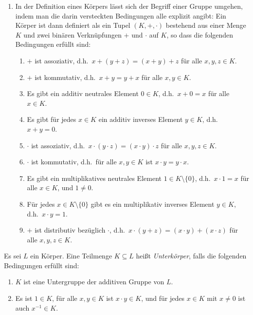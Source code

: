 \begin{bem}
\begin{enumerate}[leftmargin=*]
  \item
   In der Definition eines Körpers lässt sich der Begriff einer Gruppe umgehen, indem man die darin versteckten Bedingungen alle explizit angibt: Ein Körper ist dann definiert als ein Tupel $(K,+,\cdot)$ bestehend aus einer Menge $K$ und zwei binären Verknüpfungen $+$ und $\cdot$ auf $K$, so dass die folgenden Bedingungen erfüllt sind:
   \begin{enumerate}[label=\roman*)]
    \item
     $+$ ist assoziativ, d.h.\ $x+(y+z) = (x+y)+z$ für alle $x,y,z \in K$.
    \item
     $+$ ist kommutativ, d.h.\ $x+y = y+x$ für alle $x,y \in K$.
    \item
     Es gibt ein additiv neutrales Element $0 \in K$, d.h.\ $x + 0 = x$ für alle $x \in K$.
    \item
     Es gibt für jedes $x \in K$ ein additiv inverses Element $y \in K$, d.h.\ $x+y = 0$.
    \item
     $\cdot$ ist assoziativ, d.h.\ $x \cdot (y \cdot z) = (x \cdot y) \cdot z$ für alle $x,y,z \in K$.
    \item
     $\cdot$ ist kommutativ, d.h.\ für alle $x,y \in K$ ist $x \cdot y = y \cdot x$.
    \item
     Es gibt ein multiplikatives neutrales Element $1 \in K\setminus\{0\}$, d.h.\ $x \cdot 1 = x$ für alle $x \in K$, und $1 \neq 0$.
    \item
     Für jedes $x \in K\setminus\{0\}$ gibt es ein multiplikativ inverses Element $y \in K$, d.h.\ $x \cdot y = 1$.
    \item
     $+$ ist distributiv bezüglich $\cdot$, d.h.\ $x \cdot (y+z) = (x \cdot y) + (x \cdot z)$ für alle $x,y,z \in K$.
   \end{enumerate}
 \end{enumerate}
\end{bem}


\begin{defi}
 Es sei $L$ ein Körper. Eine Teilmenge $K \subseteq L$ heißt \emph{Unterkörper}, falls die folgenden Bedingungen erfüllt sind:
 \begin{enumerate}[label=\roman*)]
  \item
   $K$ ist eine Untergruppe der additiven Gruppe von $L$.
  \item
   Es ist $1 \in K$, für alle $x,y \in K$ ist $x \cdot y \in K$, und für jedes $x \in K$ mit $x \neq 0$ ist auch $x^{-1} \in K$.
 \end{enumerate}
\end{defi}


